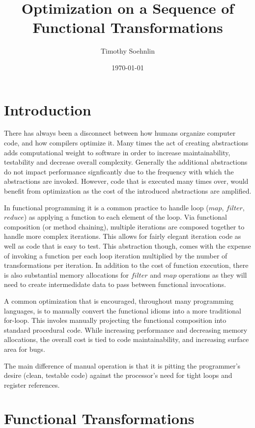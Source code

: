 \documentclass{article}
\title{Optimization on a Sequence of Functional Transformations}
\author{Timothy Soehnlin}
\date{\today}
\begin{document}
\maketitle

\section{Introduction}
  There has always been a disconnect between how humans organize computer code, and how compilers optimize it.  Many times the act of creating abstractions adds computational weight to software in order to increase maintainability, testability and decrease overall complexity.  Generally the additional abstractions do not impact performance signficantly due to the frequency with which the abstractions are invoked.  However, code that is executed many times over, would benefit from optimization as the cost of the introduced abstractions are amplified.  

  In functional programming it is a common practice to handle loop ($map$, $filter$, $reduce$) as applying a function to each element of the loop.  Via functional composition (or method chaining), multiple iterations are composed together to handle more complex iterations.  This allows for fairly elegant iteration code as well as code that is easy to test.  This abstraction though, comes with the expense of invoking a function per each loop iteration multiplied by the number of transformations per iteration. In addition to the cost of function execution, there is also substantial memory allocations for $filter$ and $map$ operations as they will need to create intermedidate data to pass between functional invocations.  

  A common optimization that is encouraged, throughout many programming languages, is to manually convert the functional idioms into a more traditional for-loop.  This involes manually projecting the functional composition into standard procedural code.  While increasing performance and decreasing memory allocations, the overall cost is tied to code maintainability, and increasing surface area for bugs.  

  The main difference of manual operation is that it is pitting the programmer's desire (clean, testable code) against the processor's need for tight loops and register references.  

\section{Functional Transformations}
\end{document}
